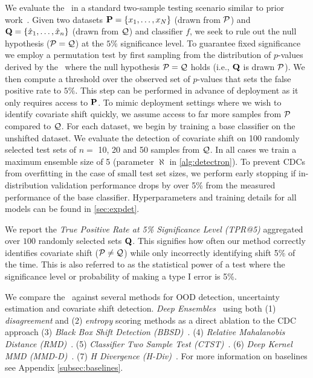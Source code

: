  We evaluate the \method\ in a standard two-sample testing scenario similar to prior work~\citep{zhao2022comparing}.
Given two datasets $\mathbf{P} = \{x_1,\dots,x_N\}$ (drawn from $\mathcal{P}$) and $\mathbf{Q} = \{\hat{x}_1,\dots,\hat{x}_n\}$ (drawn from $\mathcal{Q}$) and classifier $f$,
we seek to rule out the null hypothesis ($\mathcal{P} = \mathcal{Q}$) at the $5\%$ significance level.
To guarantee fixed significance we employ a permutation test by first sampling from the distribution of $p$-values
derived by the \method\ where the null hypothesis $\mathcal{P}=\mathcal{Q}$ holds (i.e., $\mathbf{Q}$ is drawn $\mathcal{P}$).
We then compute a threshold over the observed set of $p$-values that sets the false positive rate to $5\%$.
This step can be performed in advance of deployment as it only requires access to $\mathbf{P}$.
To mimic deployment settings where we wish to identify covariate shift quickly,
we assume access to far more samples from $\mathcal{P}$ compared to $\mathcal{Q}$.
For each dataset, we begin by training a base classifier on the unshifted dataset.
We evaluate the detection of covariate shift on 100 randomly selected test sets of $n=$ 10, 20 and 50 samples from $\mathcal{Q}$.
In all cases we train a maximum ensemble size of 5 (parameter $\aleph$ in \autoref{alg:detectron}).
To prevent CDCs from overfitting in the case of small test set sizes, we perform early stopping if in-distribution validation performance drops by over 5\% from the measured performance of the base classifier. Hyperparameters and training details for all models can be found in \autoref{sec:expdet}.

 We report the \textit{True Positive Rate at 5\% Significance Level (TPR@5)} aggregated over $100$ randomly selected sets $\mathbf{Q}$.
This signifies how often our method correctly identifies covariate shift ($\mathcal{P}\neq\mathcal{Q}$) while only incorrectly identifying shift 5\% of the time.
This is also referred to as the statistical power of a test where the significance level or probability of making a type I error is 5\%.

 We compare the \method\ against several methods for OOD detection, uncertainty estimation and covariate shift detection. \textit{Deep Ensembles}~\cite{trustuncert} using both (1) \textit{disagreement} and (2) \textit{entropy} scoring methods as a direct ablation to the CDC approach (3) \textit{Black Box Shift Detection (BBSD)}~\citep{bbsd}.
(4) \textit{Relative Mahalanobis Distance (RMD)}~\citep{relmahala}.
(5) \textit{Classifier Two Sample Test (CTST)}~\citep{paz2017revisiting}.
(6) \textit{Deep Kernel MMD (MMD-D)}~\citep{liu2020learning}.
(7) \textit{H Divergence (H-Div)}~\citep{zhao2022comparing}.
For more information on baselines see Appendix \autoref{subsec:baselines}.


